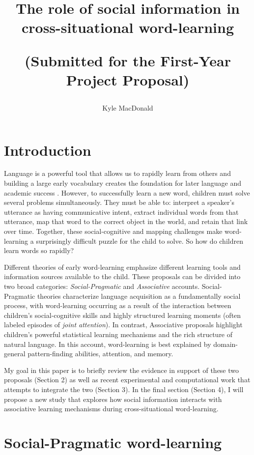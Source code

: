 \documentclass[man]{apa2}
\title{The role of social information in cross-situational word-learning

(Submitted for the First-Year Project Proposal)}
\author{Kyle MacDonald}
\affiliation{Department of Psychology, Stanford University}
\begin{document}
\maketitle

\section{Introduction}
Language is a powerful tool that allows us to rapidly learn from others and building a large early vocabulary creates the foundation for later language and academic success \cite{hart1995meaningful, qian2002investigating}. However, to successfully learn a new word, children must solve several problems simultaneously. They must be able to: interpret a speaker's utterance as having communicative intent, extract individual words from that utterance, map that word to the correct object in the world, and retain that link over time. Together, these social-cognitive and mapping challenges make word-learning a surprisingly difficult puzzle for the child to solve. So how do children learn words so rapidly?

Different theories of early word-learning emphasize different learning tools and information sources available to the child. These proposals can be divided into two broad categories: \emph{Social-Pragmatic} and \emph{Associative} accounts. Social-Pragmatic theories characterize language acquisition as a fundamentally social process, with word-learning occurring as a result of the interaction between children's social-cognitive skills and highly structured learning moments (often labeled episodes of \emph{joint attention}). In contrast, Associative proposals highlight children's powerful statistical learning mechanisms and the rich structure of natural language. In this account, word-learning is best explained by domain-general pattern-finding abilities, attention, and memory. 

My goal in this paper is to briefly review the evidence in support of these two proposals (Section 2) as well as recent experimental and computational work that attempts to integrate the two (Section 3). In the final section (Section 4), I will propose a new study that explores how social information interacts with associative learning mechanisms during cross-situational word-learning.

\section{Social-Pragmatic word-learning}
\end{document}
